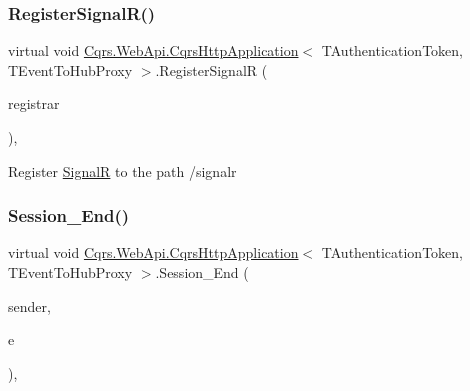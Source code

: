 \subsubsection{\texorpdfstring{Register\+Signal\+R()}{RegisterSignalR()}}
{\footnotesize\ttfamily virtual void \hyperlink{classCqrs_1_1WebApi_1_1CqrsHttpApplication}{Cqrs.\+Web\+Api.\+Cqrs\+Http\+Application}$<$ T\+Authentication\+Token, T\+Event\+To\+Hub\+Proxy $>$.Register\+SignalR (\begin{DoxyParamCaption}\item[{\hyperlink{classCqrs_1_1Configuration_1_1BusRegistrar}{Bus\+Registrar}}]{registrar }\end{DoxyParamCaption})\hspace{0.3cm}{\ttfamily [protected]}, {\ttfamily [virtual]}}



Register \hyperlink{namespaceCqrs_1_1WebApi_1_1SignalR}{SignalR} to the path /signalr 

\mbox{\label{classCqrs_1_1WebApi_1_1CqrsHttpApplication_a72e04b9b77ef87292801f8b65edace1e_a72e04b9b77ef87292801f8b65edace1e}} 
\subsubsection{\texorpdfstring{Session\+\_\+\+End()}{Session\_End()}}
{\footnotesize\ttfamily virtual void \hyperlink{classCqrs_1_1WebApi_1_1CqrsHttpApplication}{Cqrs.\+Web\+Api.\+Cqrs\+Http\+Application}$<$ T\+Authentication\+Token, T\+Event\+To\+Hub\+Proxy $>$.Session\+\_\+\+End (\begin{DoxyParamCaption}\item[{object}]{sender,  }\item[{Event\+Args}]{e }\end{DoxyParamCaption})\hspace{0.3cm}{\ttfamily [protected]}, {\ttfamily [virtual]}}

\mbox{\label{classCqrs_1_1WebApi_1_1CqrsHttpApplication_a51f539501f607c3ecae6530120c129eb_a51f539501f607c3ecae6530120c129eb}} 
